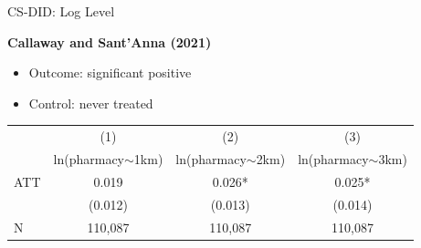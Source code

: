 \documentclass{beamer}
\begin{document}
\begin{frame}{CS-DID: Log Level}

\textbf{Callaway and Sant'Anna (2021)}

\begin{itemize}
    \item Outcome: significant positive
    \item Control: never treated
\end{itemize}

\vspace{0.5em}
\centering
\footnotesize
\begin{tabular}{lccc}
\toprule
 & (1) & (2) & (3) \\
 & ln(pharmacy$\sim$1km) & ln(pharmacy$\sim$2km) & ln(pharmacy$\sim$3km) \\
\midrule
ATT &  0.019 &   0.026*     &     0.025*    \\
    & (0.012) &   (0.013)       &  (0.014)      \\
\midrule
N   &   110,087   &  110,087   &  110,087  \\
\bottomrule
\end{tabular}

\end{frame}
\end{document}
